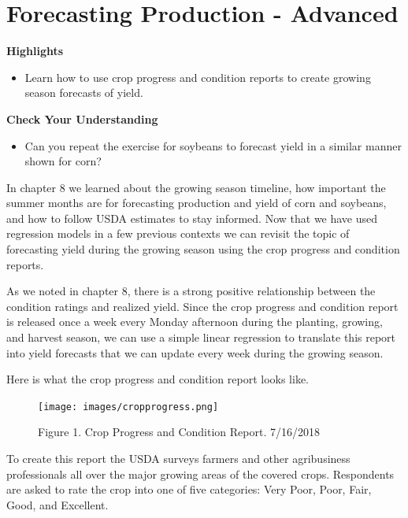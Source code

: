 \documentclass[
  letterpaper,
  DIV=11,
  numbers=noendperiod]{scrreprt}
\providecommand{\tightlist}{%
  \setlength{\itemsep}{0pt}\setlength{\parskip}{0pt}}\usepackage{longtable,booktabs,array}
\begin{document}

\hypertarget{forecasting-production---advanced}{%
\chapter{Forecasting Production -
Advanced}\label{forecasting-production---advanced}}

\textbf{Highlights}

\begin{itemize}
\tightlist
\item
  Learn how to use crop progress and condition reports to create growing
  season forecasts of yield.
\end{itemize}

\textbf{Check Your Understanding}

\begin{itemize}
\tightlist
\item
  Can you repeat the exercise for soybeans to forecast yield in a
  similar manner shown for corn?
\end{itemize}

In chapter 8 we learned about the growing season timeline, how important
the summer months are for forecasting production and yield of corn and
soybeans, and how to follow USDA estimates to stay informed. Now that we
have used regression models in a few previous contexts we can revisit
the topic of forecasting yield during the growing season using the crop
progress and condition reports.

As we noted in chapter 8, there is a strong positive relationship
between the condition ratings and realized yield. Since the crop
progress and condition report is released once a week every Monday
afternoon during the planting, growing, and harvest season, we can use a
simple linear regression to translate this report into yield forecasts
that we can update every week during the growing season.

Here is what the crop progress and condition report looks like.

\begin{figure}

{\centering \texttt{[image: images/cropprogress.png]}

}

\caption{Figure 1. Crop Progress and Condition Report. 7/16/2018}

\end{figure}

To create this report the USDA surveys farmers and other agribusiness
professionals all over the major growing areas of the covered crops.
Respondents are asked to rate the crop into one of five categories: Very
Poor, Poor, Fair, Good, and Excellent.
\end{document}
